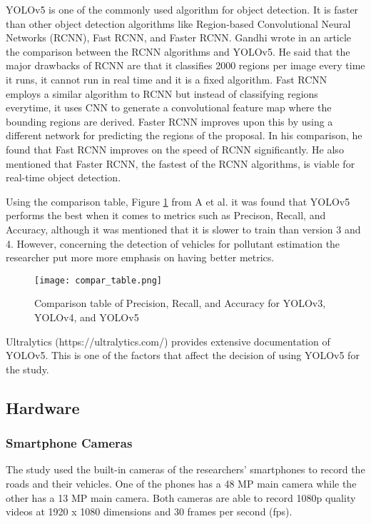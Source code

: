 	YOLOv5 is one of the commonly used algorithm for object detection. It is faster than other object detection algorithms like Region-based Convolutional Neural Networks (RCNN), Fast RCNN, and Faster RCNN. Gandhi \citeyear{gandhi_2018} wrote in an article the comparison between the RCNN algorithms and YOLOv5. He said that the major drawbacks of RCNN are that it classifies 2000 regions per image every time it runs, it cannot run in real time and it is a fixed algorithm. Fast RCNN employs a similar algorithm to RCNN but instead of classifying regions everytime, it uses CNN to generate a convolutional feature map where the bounding regions are derived. Faster RCNN improves upon this by using a different network for predicting the regions of the proposal. In his comparison, he found that Fast RCNN improves on the speed of RCNN significantly. He also mentioned that Faster RCNN, the fastest of the RCNN algorithms, is viable for real-time object detection. 
	
	Using the comparison table, Figure \ref{fig:compar_table} from A et al. \citeyear{RAMYA} it was found that YOLOv5 performs the best when it comes to metrics such as Precison, Recall, and Accuracy, although it was mentioned that it is slower to train than version 3 and 4. However, concerning the detection of vehicles for pollutant estimation the researcher put more more emphasis on having better metrics. 
	
	\begin{figure}[!htbp]
		\centering
		\texttt{[image: compar\_table.png]}
		\caption{Comparison table of Precision, Recall, and Accuracy for YOLOv3, YOLOv4, and YOLOv5}
		\label{fig:compar_table}
	\end{figure}
	\FloatBarrier



Ultralytics (https://ultralytics.com/) provides extensive documentation of YOLOv5. This is one of the factors that affect the decision of using YOLOv5 for the study.



\subsection{Hardware}

\subsubsection{Smartphone Cameras}
The study used the built-in cameras of the researchers' smartphones to record the roads and their vehicles. One of the phones has a 48 MP main camera while the other has a 13 MP main camera. Both cameras are able to record 1080p quality videos at 1920 x 1080 dimensions and 30 frames per second (fps).

